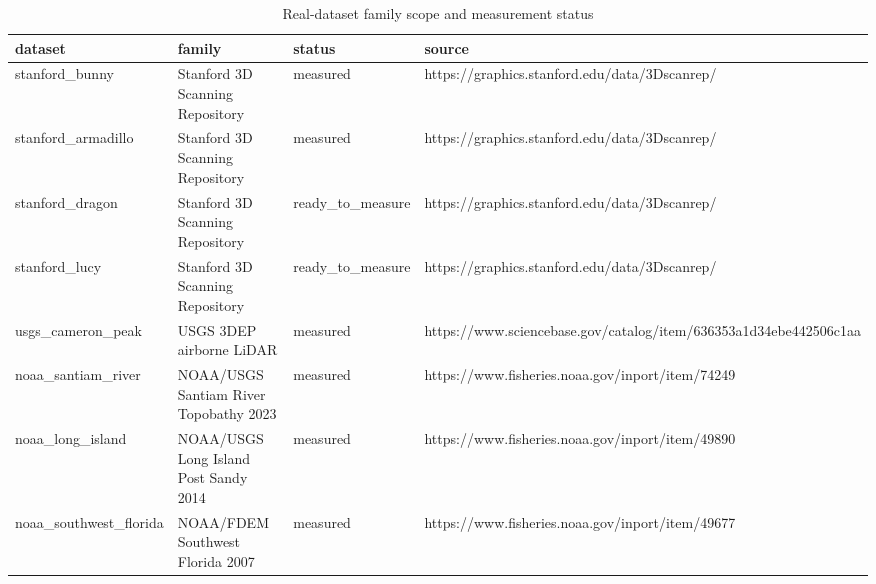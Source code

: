 \begin{table}
\caption{Real-dataset family scope and measurement status}
\label{tab:real_dataset_catalog}
\begin{tabular}{llll}
\toprule
dataset & family & status & source \\
\midrule
stanford\_bunny & Stanford 3D Scanning Repository & measured & https://graphics.stanford.edu/data/3Dscanrep/ \\
stanford\_armadillo & Stanford 3D Scanning Repository & measured & https://graphics.stanford.edu/data/3Dscanrep/ \\
stanford\_dragon & Stanford 3D Scanning Repository & ready\_to\_measure & https://graphics.stanford.edu/data/3Dscanrep/ \\
stanford\_lucy & Stanford 3D Scanning Repository & ready\_to\_measure & https://graphics.stanford.edu/data/3Dscanrep/ \\
usgs\_cameron\_peak & USGS 3DEP airborne LiDAR & measured & https://www.sciencebase.gov/catalog/item/636353a1d34ebe442506c1aa \\
noaa\_santiam\_river & NOAA/USGS Santiam River Topobathy 2023 & measured & https://www.fisheries.noaa.gov/inport/item/74249 \\
noaa\_long\_island & NOAA/USGS Long Island Post Sandy 2014 & measured & https://www.fisheries.noaa.gov/inport/item/49890 \\
noaa\_southwest\_florida & NOAA/FDEM Southwest Florida 2007 & measured & https://www.fisheries.noaa.gov/inport/item/49677 \\
\bottomrule
\end{tabular}
\end{table}
